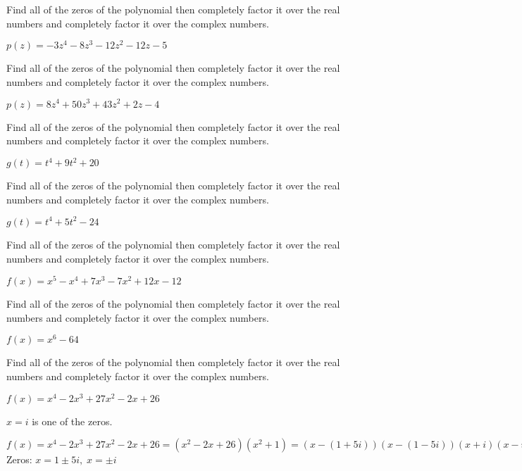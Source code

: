 \documentclass{ximera}
\begin{document}
\begin{problem}
Find all of the zeros of the polynomial then completely factor it over the real numbers and completely factor it over the complex numbers.

$p(z) = -3z^4-8z^3-12z^2-12z-5$
\end{problem}

\begin{problem}
Find all of the zeros of the polynomial then completely factor it over the real numbers and completely factor it over the complex numbers.

$p(z) = 8z^4+50z^3+43z^2+2z-4$
\end{problem}

\begin{problem}
Find all of the zeros of the polynomial then completely factor it over the real numbers and completely factor it over the complex numbers.

$g(t) = t^4+9t^2+20$
\end{problem}

\begin{problem}
Find all of the zeros of the polynomial then completely factor it over the real numbers and completely factor it over the complex numbers.

$g(t) = t^4 + 5t^2 - 24$
\end{problem}

\begin{problem}
Find all of the zeros of the polynomial then completely factor it over the real numbers and completely factor it over the complex numbers.

$f(x) = x^5 - x^4+7x^3-7x^2+12x-12$
\end{problem}

\begin{problem}
Find all of the zeros of the polynomial then completely factor it over the real numbers and completely factor it over the complex numbers.

$f(x) = x^6-64$
\end{problem}

\begin{problem}
Find all of the zeros of the polynomial then completely factor it over the real numbers and completely factor it over the complex numbers.

$f(x) = x^{4} - 2x^{3} + 27x^{2} - 2x + 26$

\begin{hint}
$x = i$ is one of the zeros.  
\end{hint}

\begin{solution}
$f(x) = x^{4} - 2x^{3} + 27x^{2} - 2x + 26 = (x^{2} - 2x + 26)(x^{2} + 1) = (x - (1 + 5i))(x - (1 - 5i))(x + i)(x - i)$\\ 
Zeros: $x = 1 \pm 5i, \; x = \pm i$
\end{solution}
\end{problem}
\end{document}

